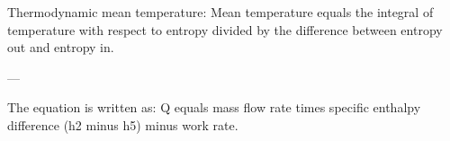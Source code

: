 Thermodynamic mean temperature:  
Mean temperature equals the integral of temperature with respect to entropy divided by the difference between entropy out and entropy in.  

---

The equation is written as:  
Q equals mass flow rate times specific enthalpy difference (h2 minus h5) minus work rate.